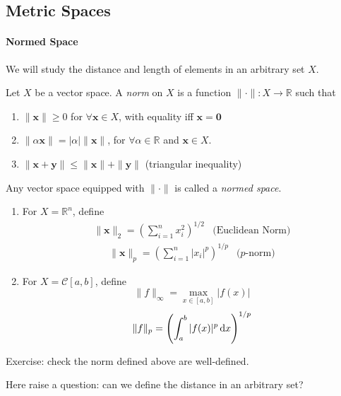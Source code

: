 \subsection{Metric Spaces}
\paragraph{Normed Space}
We will study the distance and length of elements in an arbitrary set $X$.
\begin{definition}
Let $X$ be a vector space. A \emph{norm} on $X$ is a function $\|\cdot\|:X\to\mathbb{R}$ such that
\begin{enumerate}
\item
$\|\bm x\|\ge0$ for $\forall\bm x\in X$, with equality iff $\bm x=\bm0$
\item
$\|\alpha\bm x\|=|\alpha|\|\bm x\|$, for $\forall\alpha\in\mathbb{R}$ and $\bm x\in X$.
\item
$\|\bm x+\bm y\|\le\|\bm x\|+\|\bm y\|$ (triangular inequality)
\end{enumerate}
Any vector space equipped with $\|\cdot\|$ is called a \emph{normed space}.
\end{definition}

\begin{example}
\begin{enumerate}
\item
For $X=\mathbb{R}^n$, define 
\[
\begin{array}{ll}
\|\bm x\|_2=\left(\sum_{i=1}^nx_i^2\right)^{1/2}
&
\mbox{(Euclidean Norm)}
\end{array}
\]
\[
\begin{array}{ll}
\|\bm x\|_p=\left(\sum_{i=1}^n|x_i|^p\right)^{1/p}
&
\mbox{($p$-norm)}
\end{array}
\]
\item
For $X=\mathcal{C}[a,b]$, define 
\[
\|f\|_\infty=\max_{x\in[a,b]}|f(x)|
\]
\[
\|f\|_p=\left(\int_a^b|f(x)|^p\,\mathrm{d} x\right)^{1/p}
\]
\end{enumerate}
Exercise: check the norm defined above are well-defined.
\end{example}
Here raise a question: can we define the distance in an arbitrary set? 

